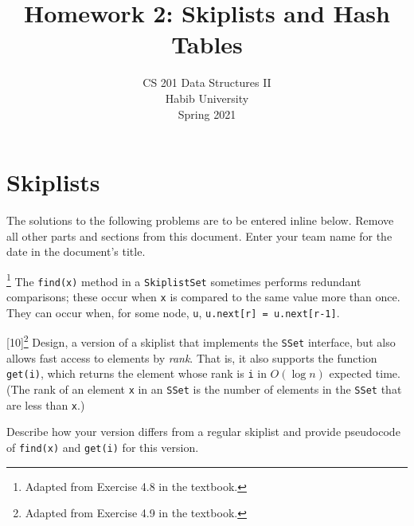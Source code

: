\documentclass[addpoints]{exam}
\title{Homework 2: Skiplists and Hash Tables}
\author{CS 201 Data Structures II\\Habib University\\Spring 2021}
\date{}  %
\begin{document}
\maketitle
\part{Skiplists}

The solutions to the following problems are to be entered inline below. Remove all other parts and sections from this document. Enter your team name for the date in the document's title.

\begin{questions}

\footnote{Adapted from Exercise 4.8 in the textbook.}
  The \texttt{find(x)} method in a \texttt{SkiplistSet} sometimes performs redundant comparisons; these occur when \texttt{x} is compared to the same value more than once. They can occur when, for some node, \texttt{u}, \texttt{u.next[r] = u.next[r-1]}.

[10]\footnote{Adapted from Exercise 4.9 in the textbook.}
  Design, a version of a skiplist that implements the \texttt{SSet} interface, but also allows fast access to elements by \textit{rank}. That is, it also supports the function \texttt{get(i)}, which returns the element whose rank is \texttt{i} in $O(\log n)$ expected time. (The rank of an element \texttt{x} in an \texttt{SSet} is the number of elements in the \texttt{SSet} that are less than \texttt{x}.)

  Describe how your version differs from a regular skiplist and provide pseudocode of \texttt{find(x)} and \texttt{get(i)} for this version.
  \begin{solution}
  \end{solution}


\end{questions}
\end{document}
